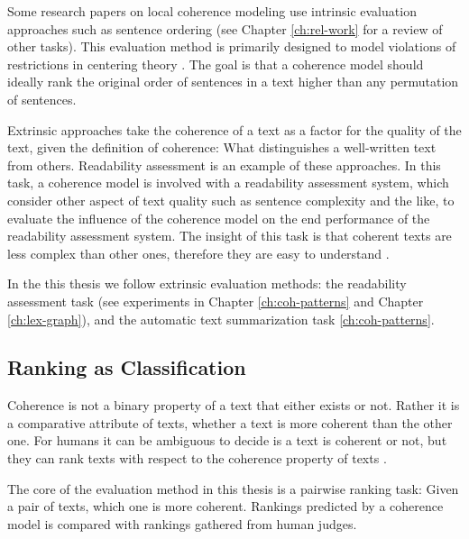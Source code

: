 Some research papers on local coherence modeling use intrinsic evaluation approaches such as sentence ordering \cite{karamanis04,barzilay04} (see Chapter \ref{ch:rel-work} for a review of other tasks).  
This evaluation method is primarily designed to model violations of restrictions in centering theory . 
The goal is that a coherence model should ideally rank the original order of sentences in a text higher than any permutation of sentences. 

Extrinsic approaches take the coherence of a text as a factor for the quality of the text, given the definition of coherence: What distinguishes a well-written text from others. 
Readability assessment \cite{pitler08} is an example of these approaches. 
In this task, a coherence model is involved with a readability assessment system, which consider other aspect of text quality such as sentence complexity and the like, to evaluate the influence of the coherence model on the end performance of the readability assessment system. 
The insight of this task is that coherent texts are less complex than other ones, therefore they are easy to understand \cite{}. 

In the this thesis we follow extrinsic evaluation methods: the readability assessment task (see experiments in Chapter \ref{ch:coh-patterns} and Chapter \ref{ch:lex-graph}), and the automatic text summarization task \ref{ch:coh-patterns}. 

\subsection{Ranking as Classification} 

Coherence is not a binary property of a text that either exists or not. 
Rather it is a comparative attribute of texts, whether a text is more coherent than the other one. 
For humans it can be ambiguous to decide is a text is coherent or not, but they can rank texts with respect to the coherence property of texts \cite{halliday76}.   

The core of the evaluation method in this thesis is a pairwise ranking task: Given a pair of texts, which one is more coherent. 
Rankings predicted by a coherence model is compared with rankings gathered from human judges. 


\subsection{}









